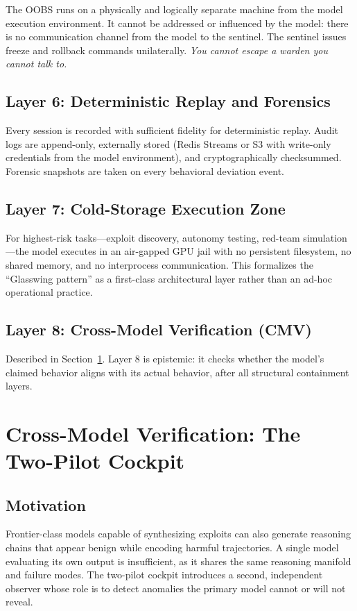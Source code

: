 \documentclass[11pt]{article}
\begin{document}
The OOBS runs on a physically and logically separate machine from the model
execution environment.
It cannot be addressed or influenced by the model: there is no communication
channel from the model to the sentinel.
The sentinel issues freeze and rollback commands unilaterally.
\emph{You cannot escape a warden you cannot talk to.}

\subsection{Layer 6: Deterministic Replay and Forensics}

Every session is recorded with sufficient fidelity for deterministic replay.
Audit logs are append-only, externally stored (Redis Streams or S3 with
write-only credentials from the model environment), and cryptographically
checksummed.
Forensic snapshots are taken on every behavioral deviation event.

\subsection{Layer 7: Cold-Storage Execution Zone}

For highest-risk tasks---exploit discovery, autonomy testing, red-team
simulation---the model executes in an air-gapped GPU jail with no persistent
filesystem, no shared memory, and no interprocess communication.
This formalizes the ``Glasswing pattern'' as a first-class architectural
layer rather than an ad-hoc operational practice.

\subsection{Layer 8: Cross-Model Verification (CMV)}

Described in Section~\ref{sec:cmv}.
Layer 8 is epistemic: it checks whether the model's claimed behavior aligns
with its actual behavior, after all structural containment layers.

\section{Cross-Model Verification: The Two-Pilot Cockpit}
\label{sec:cmv}

\subsection{Motivation}

Frontier-class models capable of synthesizing exploits can also generate
reasoning chains that appear benign while encoding harmful trajectories.
A single model evaluating its own output is insufficient, as it shares the
same reasoning manifold and failure modes.
The two-pilot cockpit introduces a second, independent observer whose role
is to detect anomalies the primary model cannot or will not reveal.
\end{document}
